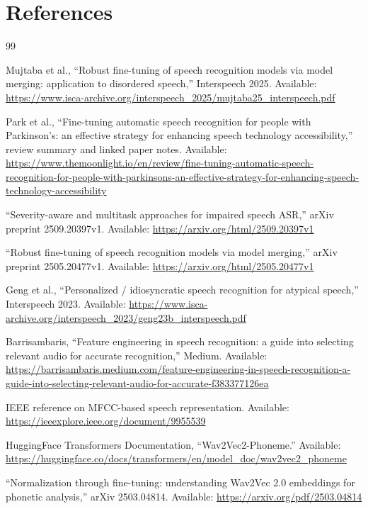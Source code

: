 \documentclass{article}
\begin{document}
\section{References}

\begin{thebibliography}{99}

Mujtaba et al., ``Robust fine-tuning of speech recognition models via model merging: application to disordered speech,'' Interspeech 2025. Available: \url{https://www.isca-archive.org/interspeech_2025/mujtaba25_interspeech.pdf}

Park et al., ``Fine-tuning automatic speech recognition for people with Parkinson's: an effective strategy for enhancing speech technology accessibility,'' review summary and linked paper notes. Available: \url{https://www.themoonlight.io/en/review/fine-tuning-automatic-speech-recognition-for-people-with-parkinsons-an-effective-strategy-for-enhancing-speech-technology-accessibility}

``Severity-aware and multitask approaches for impaired speech ASR,'' arXiv preprint 2509.20397v1. Available: \url{https://arxiv.org/html/2509.20397v1}

``Robust fine-tuning of speech recognition models via model merging,'' arXiv preprint 2505.20477v1. Available: \url{https://arxiv.org/html/2505.20477v1}

Geng et al., ``Personalized / idiosyncratic speech recognition for atypical speech,'' Interspeech 2023. Available: \url{https://www.isca-archive.org/interspeech_2023/geng23b_interspeech.pdf}

Barrisambaris, ``Feature engineering in speech recognition: a guide into selecting relevant audio for accurate recognition,'' Medium. Available: \url{https://barrisambaris.medium.com/feature-engineering-in-speech-recognition-a-guide-into-selecting-relevant-audio-for-accurate-f383377126ea}

IEEE reference on MFCC-based speech representation. Available: \url{https://ieeexplore.ieee.org/document/9955539}

HuggingFace Transformers Documentation, ``Wav2Vec2-Phoneme.'' Available: \url{https://huggingface.co/docs/transformers/en/model_doc/wav2vec2_phoneme}

``Normalization through fine-tuning: understanding Wav2Vec 2.0 embeddings for phonetic analysis,'' arXiv 2503.04814. Available: \url{https://arxiv.org/pdf/2503.04814}


\end{thebibliography}
\end{document}
